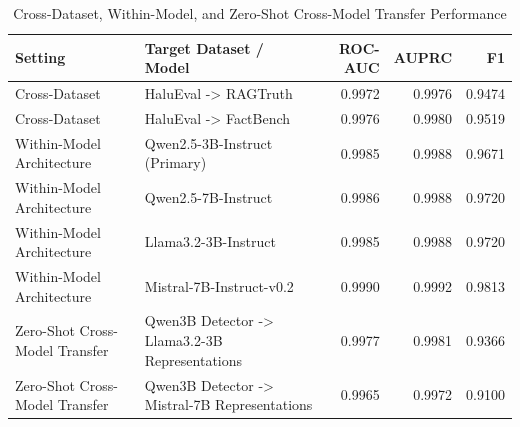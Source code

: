 \begin{table}[htbp]
\caption{Cross-Dataset, Within-Model, and Zero-Shot Cross-Model Transfer Performance}
\begin{center}
\begin{tabular}{llrrr}
\toprule
\textbf{Setting} & \textbf{Target Dataset / Model} & \textbf{ROC-AUC} & \textbf{AUPRC} & \textbf{F1} \\
\midrule
Cross-Dataset & HaluEval -> RAGTruth & 0.9972 & 0.9976 & 0.9474 \\
Cross-Dataset & HaluEval -> FactBench & 0.9976 & 0.9980 & 0.9519 \\
Within-Model Architecture & Qwen2.5-3B-Instruct (Primary) & 0.9985 & 0.9988 & 0.9671 \\
Within-Model Architecture & Qwen2.5-7B-Instruct & 0.9986 & 0.9988 & 0.9720 \\
Within-Model Architecture & Llama3.2-3B-Instruct & 0.9985 & 0.9988 & 0.9720 \\
Within-Model Architecture & Mistral-7B-Instruct-v0.2 & 0.9990 & 0.9992 & 0.9813 \\
Zero-Shot Cross-Model Transfer & Qwen3B Detector -> Llama3.2-3B Representations & 0.9977 & 0.9981 & 0.9366 \\
Zero-Shot Cross-Model Transfer & Qwen3B Detector -> Mistral-7B Representations & 0.9965 & 0.9972 & 0.9100 \\
\bottomrule
\end{tabular}
\label{tab:generalization}
\end{center}
\end{table}